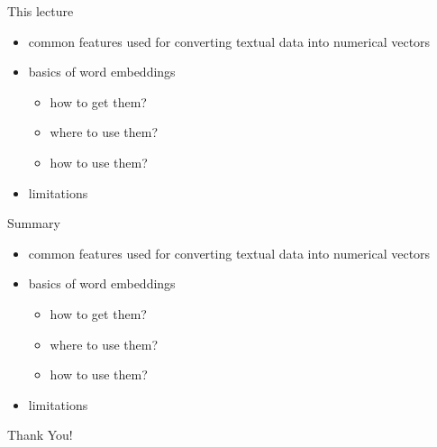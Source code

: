 \begin{frame}
\titlepage
\end{frame}

\begin{frame}{This lecture}
\vspace*{1cm}

\begin{itemize}
        \item common features used for converting textual data into numerical vectors
        \item basics of word embeddings
            \begin{itemize}
                \item how to get them? 
                \item where to use them?
                \item how to use them?
            \end{itemize}
        \item limitations
\end{itemize}
\end{frame}




\begin{frame}{Summary}
    \begin{itemize}
        \item common features used for converting textual data into numerical vectors
        \item basics of word embeddings
            \begin{itemize}
                \item how to get them? 
                \item where to use them?
                \item how to use them?
            \end{itemize}
        \item limitations
    \end{itemize}
\end{frame}
\begin{frame}[c]
\begin{center}
\LARGE{Thank You!}
\end{center}
\end{frame}

